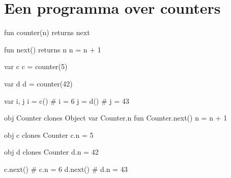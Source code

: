 \section{Een programma over counters}

\begin{minipage}{0.5\textwidth}
\begin{program}
fun counter(n) returns next

    fun next() returns n
        n = n + 1

var c
c = counter(5)

var d
d = counter(42)

var i, j
i = c() # i = 6
j = d() # j = 43
\end{program}
\end{minipage}
\begin{minipage}{0.5\textwidth}
\begin{program}
obj Counter clones Object
var Counter.n
fun Counter.next()
    n = n + 1

obj c clones Counter
c.n = 5

obj d clones Counter
d.n = 42


c.next() # c.n = 6
d.next() # d.n = 43
\end{program}
\end{minipage}

